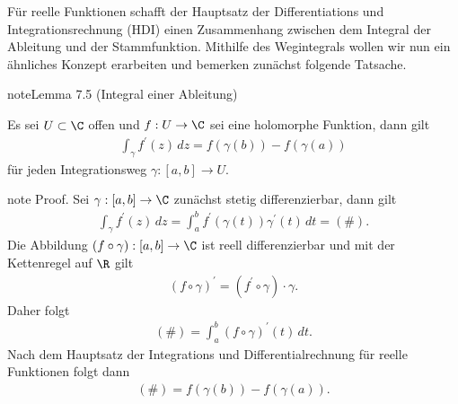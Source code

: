 \documentclass[letterpaper,10pt,german]{jupyterBook}
\begin{document}
\sphinxAtStartPar
Für reelle Funktionen schafft der Hauptsatz der Differentiations\sphinxhyphen{} und Integrationsrechnung (HDI) einen Zusammenhang zwischen dem Integral der Ableitung und der Stammfunktion. Mithilfe des Wegintegrals wollen wir nun ein ähnliches Konzept erarbeiten und bemerken zunächst folgende Tatsache.
\label{complexanalysis/kurvenintegrale:lem:intdiff}
\begin{sphinxadmonition}{note}{Lemma 7.5 (Integral einer Ableitung)}



\sphinxAtStartPar
Es sei \(U\subset\C\) offen und \(f:U\to\C\) sei eine holomorphe Funktion, dann gilt
\begin{equation*}
\begin{split}\int_\gamma f^\prime(z)\, dz= f(\gamma(b)) - f(\gamma(a))\end{split}
\end{equation*}
\sphinxAtStartPar
für jeden Integrationsweg \(\gamma:[a,b]\to U\).
\end{sphinxadmonition}

\begin{sphinxadmonition}{note}
\sphinxAtStartPar
Proof. Sei \(\gamma:[a,b]\to\C\) zunächst stetig differenzierbar, dann gilt
\begin{equation*}
\begin{split}\int_\gamma f^\prime(z)\, dz = \int_a^b f^\prime(\gamma(t))\gamma^\prime(t)\, dt =(\#).\end{split}
\end{equation*}
\sphinxAtStartPar
Die Abbildung \((f\circ \gamma):[a,b]\to\C\) ist reell differenzierbar und mit der Kettenregel auf \(\R\) gilt
\begin{equation*}
\begin{split}(f\circ\gamma)^\prime = (f^\prime\circ\gamma)\cdot\gamma.\end{split}
\end{equation*}
\sphinxAtStartPar
Daher folgt
\begin{equation*}
\begin{split}(\#) = \int_a^b (f\circ \gamma)^\prime(t)\, dt.\end{split}
\end{equation*}
\sphinxAtStartPar
Nach dem Hauptsatz der Integrations und Differentialrechnung für reelle Funktionen folgt dann
\begin{equation*}
\begin{split}(\#) = f(\gamma(b)) - f(\gamma(a)). \end{split}
\end{equation*}\end{sphinxadmonition}
\end{document}
